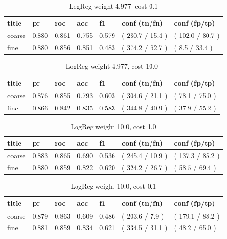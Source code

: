 \documentclass[ms]{nuthesis}
\begin{document}
\FloatBarrier
\begin{table}[H]
\centering
\begin{tabular}{|l||l||l||l||l||l||l|}\toprule
title & pr & roc & acc & f1 & conf (tn/fn) & conf (fp/tp) \\ \midrule
coarse & 0.880 & 0.861 & 0.755 & 0.579 & ( 280.7 / 15.4 ) & ( 102.0 / 80.7 ) \\
fine & 0.880 & 0.856 & 0.851 & 0.483 & ( 374.2 / 62.7 ) & ( 8.5 / 33.4 ) \\ \bottomrule
\end{tabular}
\caption{LogReg weight 4.977, cost 0.1}
\label{tab:LogRegWtOrig-Cp1}
\end{table}
\FloatBarrier


\FloatBarrier
\begin{table}[H]
\centering
\begin{tabular}{|l||l||l||l||l||l||l|}\toprule
title & pr & roc & acc & f1 & conf (tn/fn) & conf (fp/tp) \\ \midrule
coarse & 0.876 & 0.855 & 0.793 & 0.603 & ( 304.6 / 21.1 ) & ( 78.1 / 75.0 ) \\
fine & 0.866 & 0.842 & 0.835 & 0.583 & ( 344.8 / 40.9 ) & ( 37.9 / 55.2 ) \\ \bottomrule
\end{tabular}
\caption{LogReg weight 4.977, cost 10.0}
\label{tab:LogRegWtOrig-C10}
\end{table}
\FloatBarrier


\FloatBarrier
\begin{table}[H]
\centering
\begin{tabular}{|l||l||l||l||l||l||l|}\toprule
title & pr & roc & acc & f1 & conf (tn/fn) & conf (fp/tp) \\ \midrule
coarse & 0.883 & 0.865 & 0.690 & 0.536 & ( 245.4 / 10.9 ) & ( 137.3 / 85.2 ) \\
fine & 0.880 & 0.859 & 0.822 & 0.620 & ( 324.2 / 26.7 ) & ( 58.5 / 69.4 ) \\ \bottomrule
\end{tabular}
\caption{LogReg weight 10.0, cost 1.0}
\label{tab:LogRegWt10-C1}
\end{table}
\FloatBarrier


\FloatBarrier
\begin{table}[H]
\centering
\begin{tabular}{|l||l||l||l||l||l||l|}\toprule
title & pr & roc & acc & f1 & conf (tn/fn) & conf (fp/tp) \\ \midrule
coarse & 0.879 & 0.863 & 0.609 & 0.486 & ( 203.6 / 7.9 ) & ( 179.1 / 88.2 ) \\
fine & 0.881 & 0.859 & 0.834 & 0.621 & ( 334.5 / 31.1 ) & ( 48.2 / 65.0 ) \\ \bottomrule
\end{tabular}
\caption{LogReg weight 10.0, cost 0.1}
\label{tab:LogRegWt10-Cp1}
\end{table}
\FloatBarrier
\end{document}
